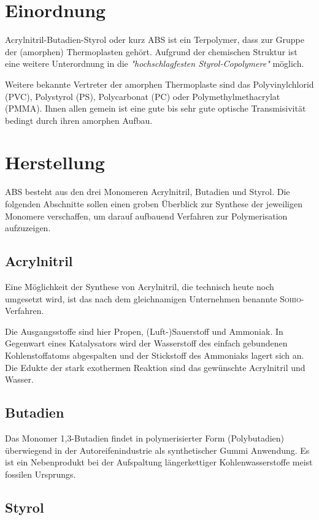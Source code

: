 \chapter{Einordnung}
    Acrylnitril-Butadien-Styrol oder kurz ABS ist ein Terpolymer, dass zur Gruppe der (amorphen) Thermoplasten gehört. Aufgrund
    der chemischen Struktur ist eine weitere Unterordnung in die \textit{"hochschlagfesten Styrol-Copolymere"}\cite{Eyerer.2020.Polymer.Engineering.1}
    möglich.\par
    Weitere bekannte Vertreter der amorphen Thermoplaste sind das Polyvinylchlorid (PVC), Polystyrol (PS), Polycarbonat (PC)
    oder Polymethylmethacrylat (PMMA). Ihnen allen gemein ist eine gute bis sehr gute optische Transmisivität bedingt durch ihren amorphen Aufbau.

\chapter{Herstellung}
    ABS besteht aus den drei Monomeren Acrylnitril, Butadien und Styrol. Die folgenden Abschnitte sollen einen groben
    Überblick zur Synthese der jeweiligen Monomere verschaffen, um darauf aufbauend Verfahren zur Polymerisation aufzuzeigen.
    \section{Acrylnitril}
        Eine Möglichkeit der Synthese von Acrylnitril, die technisch heute noch umgesetzt wird, ist das nach dem gleichnamigen
        Unternehmen benannte \textsc{Sohio}-Verfahren.\par
        Die Ausgangsstoffe sind hier Propen, (Luft-)Sauerstoff und Ammoniak. In Gegenwart eines Katalysators wird der Wasserstoff
        des einfach gebundenen Kohlenstoffatoms abgespalten und der Stickstoff des Ammoniaks lagert sich an. Die Edukte der
        stark exothermen Reaktion sind das gewünschte Acrylnitril und Wasser.\cite{sohio-verfahren.acrylnitril.synthese.Wikipedia.2020b}
    \section{Butadien}
        Das Monomer 1,3-Butadien findet in polymerisierter Form (Polybutadien) überwiegend in der Autoreifenindustrie als synthetischer Gummi
        Anwendung. Es ist ein Nebenprodukt bei der Aufspaltung längerkettiger Kohlenwasserstoffe meist fossilen Ursprungs.
    \section{Styrol}

